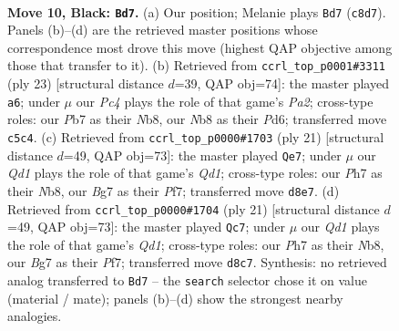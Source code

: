 \documentclass[11pt]{article}
\begin{document}
\clearpage

\begin{figure}[p]\centering
\begin{subfigure}{0.46\textwidth}\centering
\resizebox{\linewidth}{!}{%
\newchessgame
\chessboard[
  setfen={rnbqr1k1/pp3pbp/3p1np1/1BpP4/P3PP1P/2N5/1P4P1/R1BQK1NR b KQ - 2 10},
  showmover=false,
  pgfstyle=straightmove, color=movearrow, markmove={c8-d7}
]}
\caption{}
\end{subfigure}\hfill
\begin{subfigure}{0.46\textwidth}\centering
\resizebox{\linewidth}{!}{%
\newchessgame
\chessboard[
  setfen={rnbqr1k1/pp3pb1/3p1np1/2pP3p/P3P3/2N1BP2/1P1QB1PP/R3K1NR b KQ - 0 12},
  showmover=false,
  pgfstyle=straightmove, color=movearrow, markmove={a7-a6}
]}
\caption{}
\end{subfigure}
\\[4pt]
\begin{subfigure}{0.46\textwidth}\centering
\resizebox{\linewidth}{!}{%
\newchessgame
\chessboard[
  setfen={rnbqr1k1/1p3pbp/p2p1np1/2pP4/P3P3/2N1BP2/1P1QB1PP/R3K1NR b KQ - 2 11},
  showmover=false,
  pgfstyle=straightmove, color=movearrow, markmove={d8-e7}
]}
\caption{}
\end{subfigure}\hfill
\begin{subfigure}{0.46\textwidth}\centering
\resizebox{\linewidth}{!}{%
\newchessgame
\chessboard[
  setfen={rnbqr1k1/1p3pbp/p2p1np1/2pP4/P3P3/2N1BP2/1P1QB1PP/R3K1NR b KQ - 2 11},
  showmover=false,
  pgfstyle=straightmove, color=movearrow, markmove={d8-c7}
]}
\caption{}
\end{subfigure}
\caption{\textbf{Move 10, Black: \texttt{Bd7}.} (a) Our position; Melanie plays \texttt{Bd7} (\texttt{c8d7}). Panels (b)--(d) are the retrieved master positions whose correspondence most drove this move (highest QAP objective among those that transfer to it). (b) Retrieved from \texttt{ccrl\_top\_p0001\#3311} (ply 23) [structural distance $d$=39, QAP obj=74]: the master played \texttt{a6}; under $\mu$ our \emph{Pc4} plays the role of that game's \emph{Pa2}; cross-type roles: our \emph{P}b7 as their \emph{N}b8, our \emph{N}b8 as their \emph{P}d6; transferred move \texttt{c5c4}. (c) Retrieved from \texttt{ccrl\_top\_p0000\#1703} (ply 21) [structural distance $d$=49, QAP obj=73]: the master played \texttt{Qe7}; under $\mu$ our \emph{Qd1} plays the role of that game's \emph{Qd1}; cross-type roles: our \emph{P}h7 as their \emph{N}b8, our \emph{B}g7 as their \emph{P}f7; transferred move \texttt{d8e7}. (d) Retrieved from \texttt{ccrl\_top\_p0000\#1704} (ply 21) [structural distance $d$=49, QAP obj=73]: the master played \texttt{Qc7}; under $\mu$ our \emph{Qd1} plays the role of that game's \emph{Qd1}; cross-type roles: our \emph{P}h7 as their \emph{N}b8, our \emph{B}g7 as their \emph{P}f7; transferred move \texttt{d8c7}. Synthesis: no retrieved analog transferred to \texttt{Bd7} -- the \texttt{search} selector chose it on value (material / mate); panels (b)--(d) show the strongest nearby analogies.}
\label{fig:thought-m19}
\end{figure}
\end{document}
